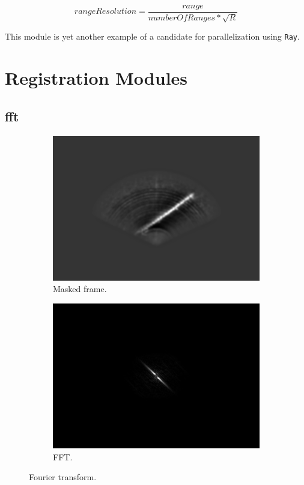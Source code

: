 \[rangeResolution = \frac{range}{numberOfRanges * \sqrt{R}}\]

This module is yet another example of a candidate for parallelization using \texttt{Ray}.

\section{Registration Modules}



\subsection{\acrfull{fft}}

\begin{figure}[H]
    \centering
    \begin{subfigure}[b]{.45\textwidth}
        \centering
        \includegraphics[width=\textwidth]{figures/pipeline/Masking.png}
        \caption{Masked frame.}
    \end{subfigure}
    \hfill
    \begin{subfigure}[b]{.45\textwidth}
        \centering
        \includegraphics[width=\textwidth]{figures/pipeline/FFT.png}
        \caption{FFT.}
    \end{subfigure}
    \caption{Fourier transform.}
    \label{fig:fft}
\end{figure}

